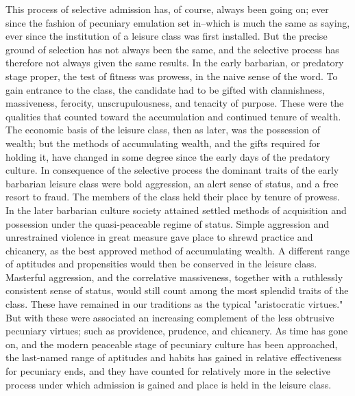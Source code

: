 \documentclass[12pt]{report}
\begin{document}
This process of selective admission has, of course, always been going
on; ever since the fashion of pecuniary emulation set in--which is much
the same as saying, ever since the institution of a leisure class was
first installed. But the precise ground of selection has not always been
the same, and the selective process has therefore not always given the
same results. In the early barbarian, or predatory stage proper, the
test of fitness was prowess, in the naive sense of the word. To gain
entrance to the class, the candidate had to be gifted with clannishness,
massiveness, ferocity, unscrupulousness, and tenacity of purpose. These
were the qualities that counted toward the accumulation and continued
tenure of wealth. The economic basis of the leisure class, then as
later, was the possession of wealth; but the methods of accumulating
wealth, and the gifts required for holding it, have changed in some
degree since the early days of the predatory culture. In consequence of
the selective process the dominant traits of the early barbarian leisure
class were bold aggression, an alert sense of status, and a free
resort to fraud. The members of the class held their place by tenure of
prowess. In the later barbarian culture society attained settled methods
of acquisition and possession under the quasi-peaceable regime of
status. Simple aggression and unrestrained violence in great measure
gave place to shrewd practice and chicanery, as the best approved method
of accumulating wealth. A different range of aptitudes and propensities
would then be conserved in the leisure class. Masterful aggression, and
the correlative massiveness, together with a ruthlessly consistent
sense of status, would still count among the most splendid traits of
the class. These have remained in our traditions as the typical
"aristocratic virtues." But with these were associated an increasing
complement of the less obtrusive pecuniary virtues; such as providence,
prudence, and chicanery. As time has gone on, and the modern peaceable
stage of pecuniary culture has been approached, the last-named range of
aptitudes and habits has gained in relative effectiveness for pecuniary
ends, and they have counted for relatively more in the selective process
under which admission is gained and place is held in the leisure class.
\end{document}
